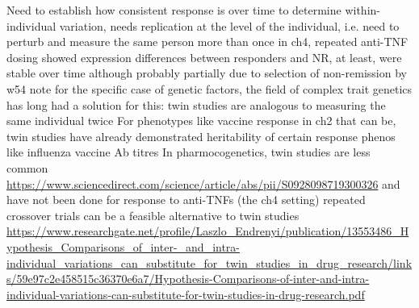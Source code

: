 \begin{outline}
\1 Need to establish how consistent response is over time
    \2 to determine within-individual variation, needs replication at the level of the individual, i.e. need to perturb and measure the same person more than once \autocite{senn2016MasteringVariationVariance}
        \3 in ch4, repeated anti-TNF dosing showed expression differences between responders and NR, at least, were stable over time
        \3 although probably partially due to selection of non-remission by w54
    \2 note for the specific case of genetic factors, the field of complex trait genetics has long had a solution for this: twin studies are analogous to measuring the same individual twice
        \3 For phenotypes like vaccine response in ch2 that can be, twin studies have already demonstrated heritability of certain response phenos like influenza vaccine Ab titres \autocite{brodin2015VariationHumanImmune}
        \3 In pharmocogenetics, twin studies are less common \url{https://www.sciencedirect.com/science/article/abs/pii/S0928098719300326} and have not been done for response to anti-TNFs (the ch4 setting)
        \3 repeated crossover trials can be a feasible alternative to twin studies \url{https://www.researchgate.net/profile/Laszlo_Endrenyi/publication/13553486_Hypothesis_Comparisons_of_inter-_and_intra-individual_variations_can_substitute_for_twin_studies_in_drug_research/links/59e97c2e458515c36370e6a7/Hypothesis-Comparisons-of-inter-and-intra-individual-variations-can-substitute-for-twin-studies-in-drug-research.pdf} \autocite{senn2016MasteringVariationVariance}


\end{outline}
